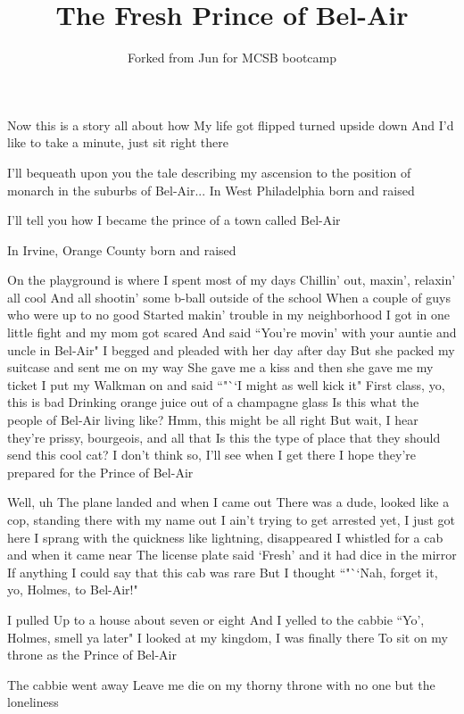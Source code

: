 \documentclass{article}
\title{The Fresh Prince of Bel-Air}
\author{Forked from Jun for MCSB bootcamp}
\begin{document}
\maketitle

Now this is a story all about how
My life got flipped turned upside down
And I'd like to take a minute, just sit right there

I'll bequeath upon you the tale describing my ascension to the position of monarch in the suburbs of Bel-Air...
In West Philadelphia born and raised

I'll tell you how I became the prince of a town called Bel-Air

In Irvine, Orange County born and raised

On the playground is where I spent most of my days
Chillin' out, maxin', relaxin' all cool
And all shootin' some b-ball outside of the school
When a couple of guys who were up to no good
Started makin' trouble in my neighborhood
I got in one little fight and my mom got scared
And said ``You're movin' with your auntie and uncle in Bel-Air"
I begged and pleaded with her day after day
But she packed my suitcase and sent me on my way
She gave me a kiss and then she gave me my ticket
I put my Walkman on and said ``"``I might as well kick it"
First class, yo, this is bad
Drinking orange juice out of a champagne glass
Is this what the people of Bel-Air living like?
Hmm, this might be all right
But wait, I hear they're prissy, bourgeois, and all that
Is this the type of place that they should send this cool cat?
I don't think so, I'll see when I get there
I hope they're prepared for the Prince of Bel-Air

Well, uh
The plane landed and when I came out
There was a dude, looked like a cop, standing there with my name out
I ain't trying to get arrested yet, I just got here
I sprang with the quickness like lightning, disappeared
I whistled for a cab and when it came near
The license plate said `Fresh' and it had dice in the mirror
If anything I could say that this cab was rare
But I thought ``"``Nah, forget it, yo, Holmes, to Bel-Air!"

I pulled
Up to a house about seven or eight
And I yelled to the cabbie ``Yo', Holmes, smell ya later"
I looked at my kingdom, I was finally there
To sit on my throne as the Prince of Bel-Air

The cabbie went away
Leave me die on my thorny throne
with no one but the loneliness
\end{document}
